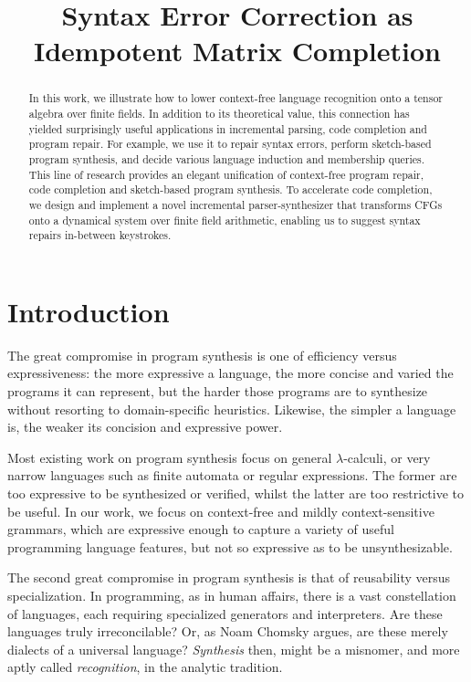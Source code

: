 \documentclass[sigplan,review,anonymous,acmsmall]{acmart}\settopmatter{printfolios=false,printccs=false,printacmref=false}
\begin{document}
\title{Syntax Error Correction as Idempotent Matrix Completion}
\begin{abstract}
In this work, we illustrate how to lower context-free language recognition onto a tensor algebra over finite fields. In addition to its theoretical value, this connection has yielded surprisingly useful applications in incremental parsing, code completion and program repair. For example, we use it to repair syntax errors, perform sketch-based program synthesis, and decide various language induction and membership queries. This line of research provides an elegant unification of context-free program repair, code completion and sketch-based program synthesis. To accelerate code completion, we design and implement a novel incremental parser-synthesizer that transforms CFGs onto a dynamical system over finite field arithmetic, enabling us to suggest syntax repairs in-between keystrokes.
\end{abstract}

\maketitle

\section{Introduction}

The great compromise in program synthesis is one of efficiency versus expressiveness: the more expressive a language, the more concise and varied the programs it can represent, but the harder those programs are to synthesize without resorting to domain-specific heuristics. Likewise, the simpler a language is, the weaker its concision and expressive power.

Most existing work on program synthesis focus on general $\lambda$-calculi, or very narrow languages such as finite automata or regular expressions. The former are too expressive to be synthesized or verified, whilst the latter are too restrictive to be useful. In our work, we focus on context-free and mildly context-sensitive grammars, which are expressive enough to capture a variety of useful programming language features, but not so expressive as to be unsynthesizable.

The second great compromise in program synthesis is that of reusability versus specialization. In programming, as in human affairs, there is a vast constellation of languages, each requiring specialized generators and interpreters. Are these languages truly irreconcilable? Or, as Noam Chomsky argues, are these merely dialects of a universal language? \textit{Synthesis} then, might be a misnomer, and more aptly called \textit{recognition}, in the analytic tradition.
\end{document}
